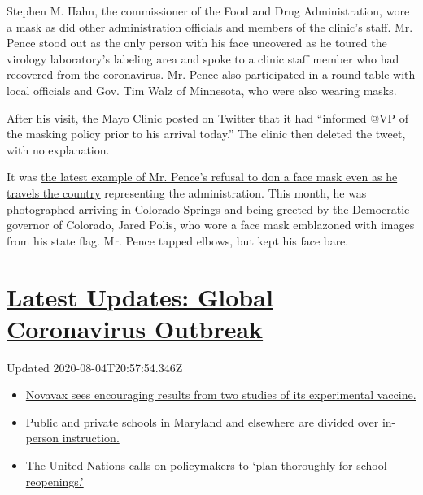 Stephen M. Hahn, the commissioner of the Food and Drug Administration,
wore a mask as did other administration officials and members of the
clinic's staff. Mr. Pence stood out as the only person with his face
uncovered as he toured the virology laboratory's labeling area and spoke
to a clinic staff member who had recovered from the coronavirus. Mr.
Pence also participated in a round table with local officials and Gov.
Tim Walz of Minnesota, who were also wearing masks.

After his visit, the Mayo Clinic posted on Twitter that it had
``informed @VP of the masking policy prior to his arrival today.'' The
clinic then deleted the tweet, with no explanation.

It was
\href{https://www.nytimes.com/2020/04/22/us/politics/coronavirus-masks.html}{the
latest example of Mr. Pence's refusal to don a face mask even as he
travels the country} representing the administration. This month, he was
photographed arriving in Colorado Springs and being greeted by the
Democratic governor of Colorado, Jared Polis, who wore a face mask
emblazoned with images from his state flag. Mr. Pence tapped elbows, but
kept his face bare.

\hypertarget{latest-updates-global-coronavirus-outbreak}{%
\section{\texorpdfstring{\href{https://www.nytimes.com/2020/08/04/world/coronavirus-cases.html?action=click\&pgtype=Article\&state=default\&region=MAIN_CONTENT_1\&context=storylines_live_updates}{Latest
Updates: Global Coronavirus
Outbreak}}{Latest Updates: Global Coronavirus Outbreak}}\label{latest-updates-global-coronavirus-outbreak}}

Updated 2020-08-04T20:57:54.346Z

\begin{itemize}
\tightlist
\item
  \href{https://www.nytimes.com/2020/08/04/world/coronavirus-cases.html?action=click\&pgtype=Article\&state=default\&region=MAIN_CONTENT_1\&context=storylines_live_updates\#link-1228a480}{Novavax
  sees encouraging results from two studies of its experimental
  vaccine.}
\item
  \href{https://www.nytimes.com/2020/08/04/world/coronavirus-cases.html?action=click\&pgtype=Article\&state=default\&region=MAIN_CONTENT_1\&context=storylines_live_updates\#link-4825b93}{Public
  and private schools in Maryland and elsewhere are divided over
  in-person instruction.}
\item
  \href{https://www.nytimes.com/2020/08/04/world/coronavirus-cases.html?action=click\&pgtype=Article\&state=default\&region=MAIN_CONTENT_1\&context=storylines_live_updates\#link-50f7386d}{The
  United Nations calls on policymakers to `plan thoroughly for school
  reopenings.'}
\end{itemize}

